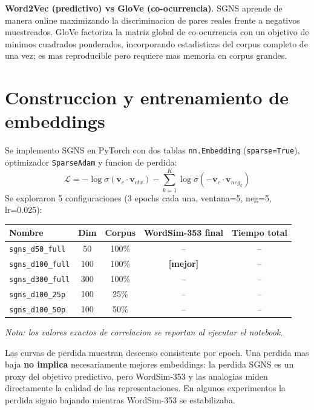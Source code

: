 \documentclass[11pt,a4paper]{article}
\begin{document}
\textbf{Word2Vec (predictivo) vs GloVe (co-ocurrencia)}. SGNS aprende de manera
online maximizando la discriminacion de pares reales frente a negativos muestreados.
GloVe factoriza la matriz global de co-ocurrencia con un objetivo de minimos cuadrados
ponderados, incorporando estadisticas del corpus completo de una vez; es mas reproducible
pero requiere mas memoria en corpus grandes.

\section{Construccion y entrenamiento de embeddings}

Se implemento SGNS en PyTorch con dos tablas \texttt{nn.Embedding} (\texttt{sparse=True}),
optimizador \texttt{SparseAdam} y funcion de perdida:
\[
  \mathcal{L} = -\log\sigma(\mathbf{v}_c \cdot \mathbf{v}_{ctx})
               - \sum_{k=1}^{K} \log\sigma(-\mathbf{v}_c \cdot \mathbf{v}_{neg_k})
\]
Se exploraron 5 configuraciones (3 epochs cada una, ventana=5, neg=5, lr=0.025):

\begin{center}
\small
\begin{tabular}{lcccc}
\toprule
Nombre & Dim & Corpus & WordSim-353 final & Tiempo total \\
\midrule
\texttt{sgns\_d50\_full}  & 50  & 100\% & -- & -- \\
\texttt{sgns\_d100\_full} & 100 & 100\% & \textbf{[mejor]} & -- \\
\texttt{sgns\_d300\_full} & 300 & 100\% & -- & -- \\
\texttt{sgns\_d100\_25p}  & 100 &  25\% & -- & -- \\
\texttt{sgns\_d100\_50p}  & 100 &  50\% & -- & -- \\
\bottomrule
\end{tabular}
\end{center}

\noindent\textit{Nota: los valores exactos de correlacion se reportan al ejecutar el notebook.}

Las curvas de perdida muestran descenso consistente por epoch. Una perdida mas baja
\textbf{no implica} necesariamente mejores embeddings: la perdida SGNS es un proxy
del objetivo predictivo, pero WordSim-353 y las analogias miden directamente la
calidad de las representaciones. En algunos experimentos la perdida siguio bajando
mientras WordSim-353 se estabilizaba.
\end{document}
